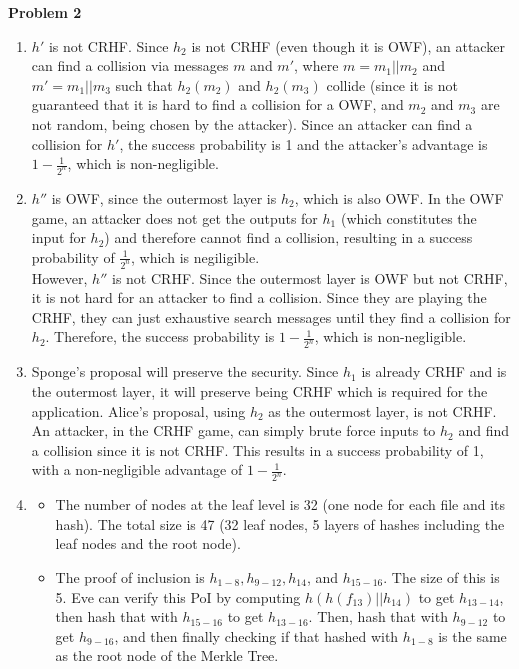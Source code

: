 \documentclass{article}
\begin{document}
\textbf{Problem 2}\begin{enumerate}
	\item $h'$ is not CRHF. Since $h_2$ is not CRHF (even though it is OWF), an attacker can find a collision via messages $m$ and $m'$, where $m=m_1||m_2$ and $m'=m_1||m_3$ such that $h_2(m_2)$ and $h_2(m_3)$ collide (since it is not guaranteed that it is hard to find a collision for a OWF, and $m_2$ and $m_3$ are not random, being chosen by the attacker). Since an attacker can find a collision for $h'$, the success probability is 1 and the attacker's advantage is $1-\frac{1}{2^n}$, which is non-negligible.
	\item $h''$ is OWF, since the outermost layer is $h_2$, which is also OWF. In the OWF game, an attacker does not get the outputs for $h_1$ (which constitutes the input for $h_2$) and therefore cannot find a collision, resulting in a success probability of $\frac{1}{2^n}$, which is negiligible.\\
		However, $h''$ is not CRHF. Since the outermost layer is OWF but not CRHF, it is not hard for an attacker to find a collision. Since they are playing the CRHF, they can just exhaustive search messages until they find a collision for $h_2$. Therefore, the success probability is $1-\frac{1}{2^n}$, which is non-negligible.
	\item Sponge's proposal will preserve the security. Since $h_1$ is already CRHF and is the outermost layer, it will preserve being CRHF which is required for the application. Alice's proposal, using $h_2$ as the outermost layer, is not CRHF. An attacker, in the CRHF game, can simply brute force inputs to $h_2$ and find a collision since it is not CRHF. This results in a success probability of 1, with a non-negligible advantage of $1-\frac{1}{2^n}$.
	\item\begin{itemize}
		\item[(a)] The number of nodes at the leaf level is 32 (one node for each file and its hash). The total size is 47 (32 leaf nodes, 5 layers of hashes including the leaf nodes and the root node).
		\item[(b)] The proof of inclusion is $h_{1-8},h_{9-12},h_{14}$, and $h_{15-16}$. The size of this is 5. Eve can verify this PoI by computing $h(h(f_{13})||h_{14})$ to get $h_{13-14}$, then hash that with $h_{15-16}$ to get $h_{13-16}$. Then, hash that with $h_{9-12}$ to get $h_{9-16}$, and then finally checking if that hashed with $h_{1-8}$ is the same as the root node of the Merkle Tree.
	\end{itemize}
\end{enumerate}
\end{document}
